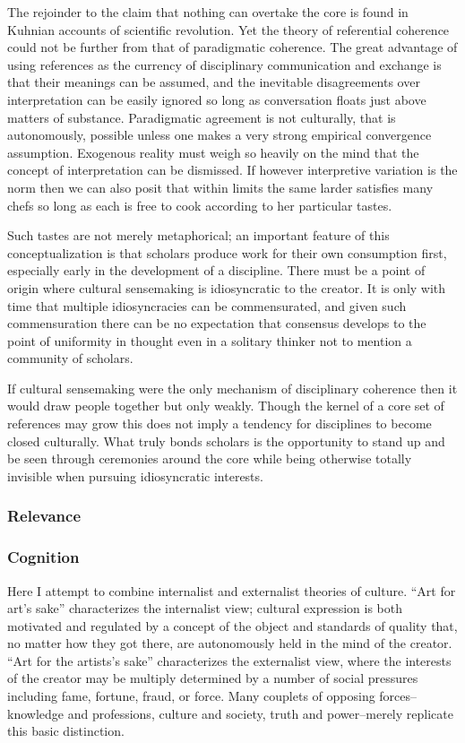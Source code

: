 \documentclass[]{article}
\begin{document}
The rejoinder to the claim that nothing can overtake the core is found
in Kuhnian accounts of scientific revolution. Yet the theory of
referential coherence could not be further from that of paradigmatic
coherence. The great advantage of using references as the currency of
disciplinary communication and exchange is that their meanings can be
assumed, and the inevitable disagreements over interpretation can be
easily ignored so long as conversation floats just above matters of
substance. Paradigmatic agreement is not culturally, that is
autonomously, possible unless one makes a very strong empirical
convergence assumption. Exogenous reality must weigh so heavily on the
mind that the concept of interpretation can be dismissed. If however
interpretive variation is the norm then we can also posit that within
limits the same larder satisfies many chefs so long as each is free to
cook according to her particular tastes.

Such tastes are not merely metaphorical; an important feature of this
conceptualization is that scholars produce work for their own
consumption first, especially early in the development of a discipline.
There must be a point of origin where cultural sensemaking is
idiosyncratic to the creator. It is only with time that multiple
idiosyncracies can be commensurated, and given such commensuration there
can be no expectation that consensus develops to the point of uniformity
in thought even in a solitary thinker not to mention a community of
scholars.

If cultural sensemaking were the only mechanism of disciplinary
coherence then it would draw people together but only weakly. Though the
kernel of a core set of references may grow this does not imply a
tendency for disciplines to become closed culturally. What truly bonds
scholars is the opportunity to stand up and be seen through ceremonies
around the core while being otherwise totally invisible when pursuing
idiosyncratic interests.

\subsubsection{Relevance}\label{relevance}

\subsubsection{Cognition}\label{cognition}

Here I attempt to combine internalist and externalist theories of
culture. ``Art for art's sake'' characterizes the internalist view;
cultural expression is both motivated and regulated by a concept of the
object and standards of quality that, no matter how they got there, are
autonomously held in the mind of the creator. ``Art for the artists's
sake'' characterizes the externalist view, where the interests of the
creator may be multiply determined by a number of social pressures
including fame, fortune, fraud, or force. Many couplets of opposing
forces--knowledge and professions, culture and society, truth and
power--merely replicate this basic distinction.
\end{document}
